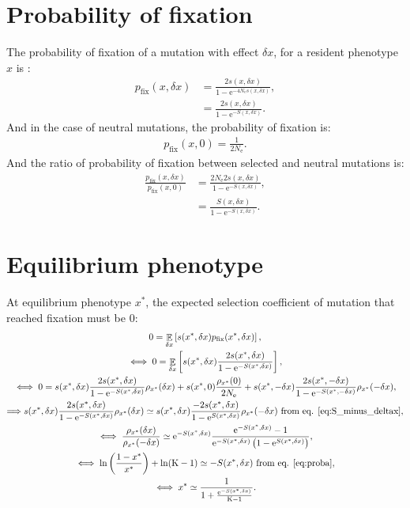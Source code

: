 \documentclass{article}
\DeclareMathOperator{\E}{\mathbb{E}}
\newcommand{\e}{\mathrm{e}}
\newcommand{\Ne}{N_{\mathrm{e}}}
\newcommand{\Nstate}{\text{K}}
\newcommand{\x}{x}
\newcommand{\eq}{^{*}}
\newcommand{\dx}{\delta \x}
\begin{document}
\section*{Probability of fixation}
The probability of fixation of a mutation with effect $\dx$, for a resident phenotype $\x$ is :
\begin{align}
p_{\text{fix}}(\x, \dx) &= \frac{ 2 s(\x, \dx)}{1 - \e^{-4\Ne s(\x, \dx)}}, \\
 &= \frac{ 2 s(\x, \dx)}{1 - \e^{-S(\x, \dx)}}. \label{eq:pfix}
\end{align}
And in the case of neutral mutations, the probability of fixation is:
\begin{gather}
p_{\text{fix}}(\x, 0) = \frac{ 1}{2 \Ne} \label{eq:pfix0}.
\end{gather}
And the ratio of probability of fixation between selected and neutral mutations is:
\begin{align}
\frac{p_{\text{fix}}(\x, \dx)}{p_{\text{fix}}(\x, 0)} & = \frac{ 2 \Ne 2 s(\x, \dx)}{1 - \e^{-S(\x, \dx)}},\\
& = \frac{S(\x, \dx)}{1 - \e^{-S(\x, \dx)}} \label{eq:pfixratio}.
\end{align}
\section*{Equilibrium phenotype}
At equilibrium phenotype $\x\eq$, the expected selection coefficient of mutation that reached fixation must be $0$:
\begin{gather}
 0 = \E_{\dx} \left[ s(\x\eq, \dx) p_{\text{fix}}(\x\eq, \dx) \right], \\
\iff 0 = \E_{\dx} \left[ s(\x\eq, \dx)\frac{ 2 s(\x\eq, \dx)}{1 - \e^{-S(\x\eq, \dx)}} \right], \\
\iff 0 = s(\x\eq, \dx)\frac{ 2s(\x\eq, \dx)}{1 - \e^{-S(\x\eq, \dx)}}   \rho_{\x\eq}(\dx) + s(\x\eq, 0) \frac{ \rho_{\x\eq}(0)}{2\Ne} + s(\x\eq, -\dx)\frac{ 2s(\x\eq, -\dx)}{1 - \e^{-S(\x\eq, -\dx)}}   \rho_{\x\eq}(-\dx), \\
\Longrightarrow s(\x\eq, \dx) \frac{ 2s(\x\eq, \dx)}{1 - \e^{-S(\x\eq, \dx)}}   \rho_{\x\eq}(\dx) \simeq s(\x\eq, \dx) \frac{ - 2s(\x\eq, \dx)}{1 - \e^{S(\x\eq, \dx)}}   \rho_{\x\eq}(-\dx) \text{ from eq. \ref{eq:S_minus_deltax}}, \\
\iff \frac{ \rho_{\x\eq}(\dx)}{\rho_{\x\eq}(-\dx)} \simeq \e^{-S(\x\eq, \dx)} \frac{ \e^{-S(\x\eq, \dx)} - 1}{ \e^{-S(\x\eq, \dx)} \left( 1 - \e^{S(\x\eq, \dx)} \right)}, \\
\iff \ln \left( \frac{1 - \x\eq}{\x\eq} \right) + \ln (\Nstate-1) \simeq -S(\x\eq, \dx) \text{ from eq. \ref{eq:proba}} \label{eq:equilibrium}, \\
\iff \x\eq \simeq \frac{1}{1 + \frac{\e^{-S(\x\eq, \dx)}}{\Nstate-1}}.
\end{gather}
\end{document}
